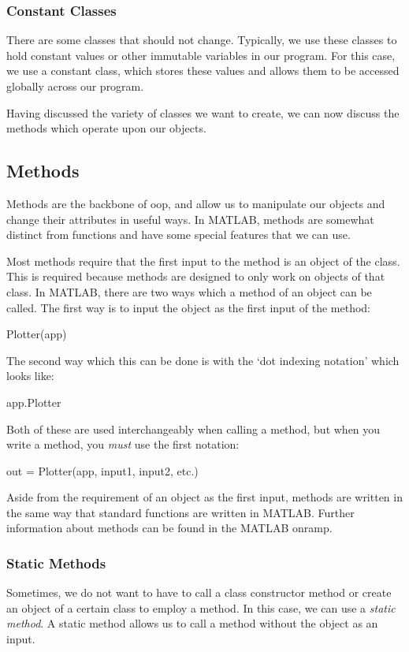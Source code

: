 \documentclass[10pt, openany, titlepage]{book}
\theoremstyle{definition}
\begin{document}
\subsubsection{Constant Classes}
There are some classes that should not change. Typically, we use these classes to hold constant values or other immutable variables in our program. For this case, we use a constant class, which stores these values and allows them to be accessed globally across our program.

Having discussed the variety of classes we want to create, we can now discuss the methods which operate upon our objects.

\subsection{Methods}
Methods are the backbone of \gls{oop}, and allow us to manipulate our objects and change their attributes in useful ways. In MATLAB, methods are somewhat distinct from functions and have some special features that we can use. 

Most methods require that the first input to the method is an object of the class. This is required because methods are designed to only work on objects of that class. In MATLAB, there are two ways which a method of an object can be called. The first way is to input the object as the first input of the method:

\begin{matlabscript}{}
Plotter(app)
\end{matlabscript}
The second way which this can be done is with the `dot indexing notation' which looks like:
\begin{matlabscript}{}
app.Plotter
\end{matlabscript}

Both of these are used interchangeably when calling a method, but when you write a method, you \textit{must} use the first notation:
\begin{matlabscript}{}
out = Plotter(app, input1, input2, etc.)
\end{matlabscript}

Aside from the requirement of an object as the first input, methods are written in the same way that standard functions are written in MATLAB. Further information about methods can be found in the MATLAB onramp.

\subsubsection{Static Methods}
Sometimes, we do not want to have to call a class constructor method or create an object of a certain class to employ a method. In this case, we can use a \textit{static method}. A static method allows us to call a method without the object as an input.
\end{document}
